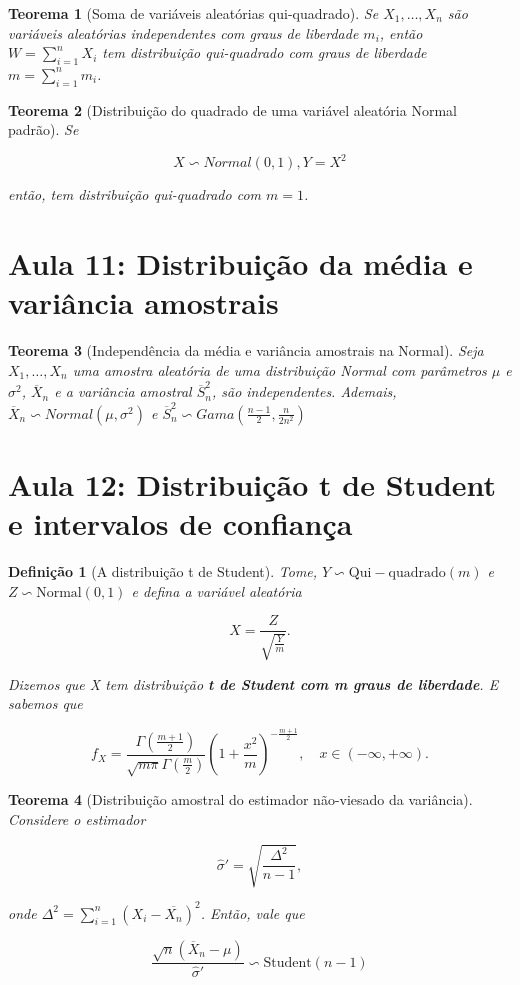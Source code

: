 \documentclass{article}
\newtheorem{theorem}{Teorema}
\newtheorem{definition}{Definição}
\begin{document}
\begin{theorem}[Soma de variáveis aleatórias qui-quadrado]
Se $X_1, \ldots, X_n$ são variáveis aleatórias independentes com graus de liberdade $m_i$, então $W = \sum_{i = 1}^n X_i$ tem distribuição qui-quadrado com graus de liberdade $m = \sum_{i = 1}^n m_i$.
\end{theorem}

\begin{theorem}[Distribuição do quadrado de uma variável aleatória Normal padrão]
Se 

$$X \backsim Normal(0, 1), Y = X^2$$ 

então, tem distribuição qui-quadrado com $m = 1$.
\end{theorem}

\section*{Aula 11: Distribuição da média e variância amostrais}

\begin{theorem}[Independência da média e variância amostrais na Normal]
Seja $X_1, \ldots, X_n$ uma amostra aleatória de uma distribuição Normal com parâmetros $\mu$ e $\sigma^2$, $\overline{X}_n$ e a variância amostral $\overline{S}_n^2$, são independentes. Ademais, $\overline{X}_n \backsim Normal \left ( \mu, \sigma^2 \right )$ e $\overline{S}_n^2 \backsim Gama \left ( \frac{n - 1}{2}, \frac{n}{2 n^2} \right )$
\end{theorem}

\section*{Aula 12: Distribuição t de Student  e intervalos de confiança}

\begin{definition}[A distribuição t de Student]
Tome, $Y \backsim \mathrm{Qui-quadrado}(m)$ e $Z \backsim \mathrm{Normal}(0, 1)$ e defina a variável aleatória

$$X = \frac{Z}{\sqrt{\frac{Y}{m}}}.$$

Dizemos que X tem distribuição \textbf{t de Student com m graus de liberdade}. E sabemos que

$$f_X = \frac{\Gamma(\frac{m + 1}{2})}{\sqrt{m \pi} \Gamma(\frac{m}{2})} \left ( 1 + \frac{x^2}{m} \right )^{-\frac{m + 1}{2}}, \quad x \in (-\infty, + \infty).$$
\end{definition}

\begin{theorem}[Distribuição amostral do estimador não-viesado da variância]

Considere o estimador

$$\hat{\sigma}' = \sqrt{\frac{\Delta^2}{n - 1}},$$

onde $\Delta^2 = \sum_{i = 1}^n (X_i - \overline{X_n})^2$. Então, vale que

$$\frac{\sqrt{n} (\overline{X}_n - \mu)}{\hat{\sigma}'} \backsim \mathrm{Student}(n - 1)$$
\end{theorem}
\end{document}

